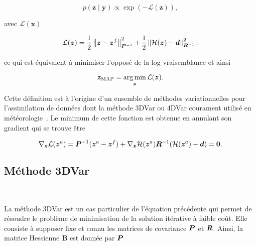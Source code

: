 \begin{equation*}
    p(\bm z \mid \bm y) \propto \exp\left(- \mathcal{L}(\bm z)\right),
\end{equation*}

avec $\mathcal L(\bm x)$

\begin{equation*}
    \mathcal L(\bm z) = \frac12 \left\lVert \bm z - \bm z^f \right\rVert^2_{ \bm{P}^{-1}} + \frac12 \left\lVert \mathcal H(\bm z) - \bm d \right\rVert^2_{\bm{R}^{-1}}.
\end{equation*}

ce qui est équivalent à minimiser l'opposé de la log-vraisemblance et ainsi

\begin{equation*}
    \bm z_{\text{MAP}} = \operatorname*{arg\,min}_{\bm z} \mathcal L(\bm z).
\end{equation*}

Cette définition est à l'origine d'un ensemble de méthodes variationnelles pour l'assimilation de données dont la méthode 3DVar ou 4DVar courament utilisé en météorologie~\cite{talagrand1997assimilation}.
Le minimum de cette fonction est obtenue en annulant son gradient qui se trouve être

\begin{equation*}
    \nabla_{\bm z} \mathcal L(\bm z^a) = \bm{P}^{-1} (\bm z^a - \bm z^f) + \nabla_{\bm z} \mathcal H (\bm z^a) \bm{R}^{-1}(\mathcal H(\bm z^a) - \bm d) = \bm 0.
\end{equation*}


\subsection{Méthode 3DVar}~\label{subsec:3dvar}

La méthode 3DVar est un cas particulier de l'équation précédente qui permet de résoudre le problème de minimisation de la solution itérative à faible coût. Elle consiste à supposer fixe et connu les matrices de covariance $\bm{P}$ et $\bm{R}$. Ainsi, la matrice Hessienne $\bm B$ est donnée par $\bm{P}$

